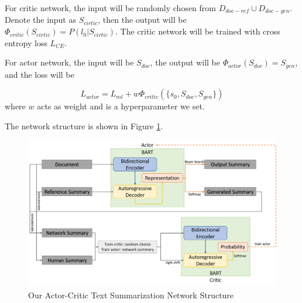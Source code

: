 \documentclass[11pt,a4paper]{article}
\begin{document}
For critic network, the input will be randomly chosen from $D_{doc-ref}\cup D_{doc-gen}$. Denote the input as $S_{cirtic}$, then the output will be $\Phi_{critic}(S_{cirtic})=P(l_0|S_{cirtic})$. The critic network will be trained with cross entropy loss $L_{CE}$.

For actor network, the input will be $S_{doc}$, the output will be $\Phi_{actor}(S_{doc})=S_{gen}$, and the loss will be

\begin{equation}
    L_{actor} = L_{ml} + w\Phi_{critic}(\{s_0, S_{doc}, S_{gen}\})
\end{equation}
where $w$ acts as weight and is a hyperparameter we set.

The network structure is shown in Figure \ref{fig:network structure}. 

\begin{figure}[h!]
    \centering
    \includegraphics[width=\textwidth]{network structure.png}
    \caption{Our Actor-Critic Text Summarization Network Structure}
    \label{fig:network structure}
\end{figure}
\end{document}
